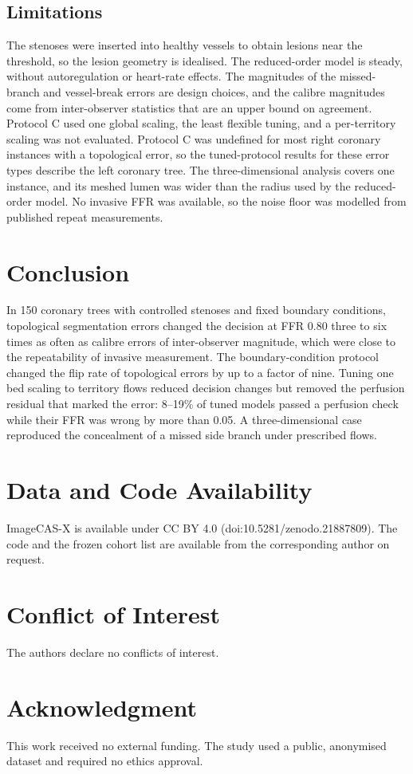 \documentclass[journal]{IEEEtran}
\begin{document}
\subsection{Limitations}
The stenoses were inserted into healthy vessels to obtain lesions near the threshold, so the lesion geometry is
idealised. The reduced-order model is steady, without autoregulation or heart-rate effects. The magnitudes of the
missed-branch and vessel-break errors are design choices, and the calibre magnitudes come from inter-observer
statistics that are an upper bound on agreement. Protocol C used one global scaling, the least flexible tuning, and
a per-territory scaling was not evaluated. Protocol C was undefined for most right coronary instances with a
topological error, so the tuned-protocol results for these error types describe the left coronary tree. The
three-dimensional analysis covers one instance, and its meshed lumen was wider than the radius used by the
reduced-order model. No invasive FFR was available, so the noise floor was modelled from published repeat
measurements.

\section{Conclusion}
In 150 coronary trees with controlled stenoses and fixed boundary conditions, topological segmentation errors
changed the decision at FFR 0.80 three to six times as often as calibre errors of inter-observer magnitude, which
were close to the repeatability of invasive measurement. The boundary-condition protocol changed the flip rate of
topological errors by up to a factor of nine. Tuning one bed scaling to territory flows reduced decision changes
but removed the perfusion residual that marked the error: 8--19\% of tuned models passed a perfusion check while
their FFR was wrong by more than 0.05. A three-dimensional case reproduced the concealment of a missed side branch
under prescribed flows.

\section*{Data and Code Availability}
ImageCAS-X is available under CC BY 4.0 (doi:10.5281/zenodo.21887809). The code and the frozen cohort list are
available from the corresponding author on request.

\section*{Conflict of Interest}
The authors declare no conflicts of interest.

\section*{Acknowledgment}
This work received no external funding. The study used a public, anonymised dataset and required no ethics
approval.



\end{document}
